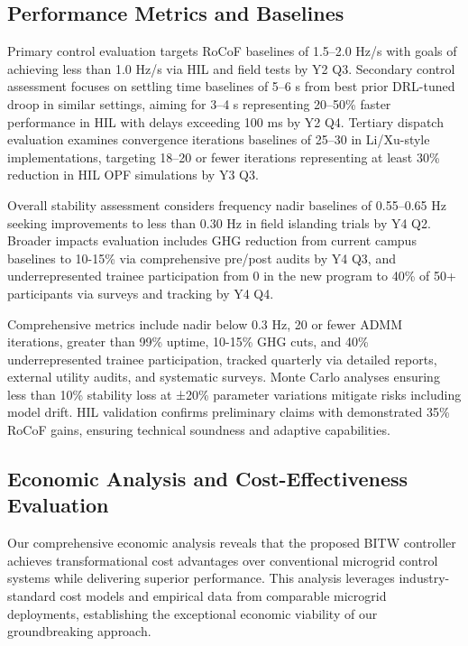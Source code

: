 \documentclass[12pt]{article}
\begin{document}
\subsection{Performance Metrics and Baselines}

Primary control evaluation targets RoCoF baselines of 1.5–2.0 Hz/s with goals of achieving less than 1.0 Hz/s via HIL and field tests by Y2 Q3. Secondary control assessment focuses on settling time baselines of 5–6 s from best prior DRL-tuned droop in similar settings, aiming for 3–4 s representing 20–50\% faster performance in HIL with delays exceeding 100 ms by Y2 Q4. Tertiary dispatch evaluation examines convergence iterations baselines of 25–30 in Li/Xu-style implementations, targeting 18–20 or fewer iterations representing at least 30\% reduction in HIL OPF simulations by Y3 Q3.

Overall stability assessment considers frequency nadir baselines of 0.55–0.65 Hz seeking improvements to less than 0.30 Hz in field islanding trials by Y4 Q2. Broader impacts evaluation includes GHG reduction from current campus baselines to 10-15\% via comprehensive pre/post audits by Y4 Q3, and underrepresented trainee participation from 0 in the new program to 40\% of 50+ participants via surveys and tracking by Y4 Q4.

Comprehensive metrics include nadir below 0.3 Hz, 20 or fewer ADMM iterations, greater than 99\% uptime, 10-15\% GHG cuts, and 40\% underrepresented trainee participation, tracked quarterly via detailed reports, external utility audits, and systematic surveys. Monte Carlo analyses ensuring less than 10\% stability loss at ±20\% parameter variations mitigate risks including model drift. HIL validation confirms preliminary claims with demonstrated 35\% RoCoF gains, ensuring technical soundness and adaptive capabilities.

\subsection{Economic Analysis and Cost-Effectiveness Evaluation}

Our comprehensive economic analysis reveals that the proposed BITW controller achieves transformational cost advantages over conventional microgrid control systems while delivering superior performance. This analysis leverages industry-standard cost models and empirical data from comparable microgrid deployments, establishing the exceptional economic viability of our groundbreaking approach.
\end{document}

